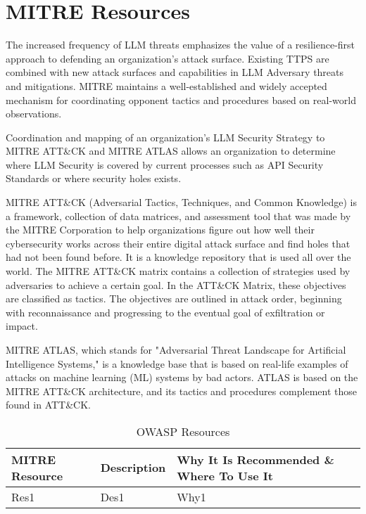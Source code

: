 \clearpage
\section{MITRE Resources}

The increased frequency of LLM threats emphasizes the value of a
resilience-first approach to defending an organization's attack surface.
Existing TTPS are combined with new attack surfaces and capabilities in LLM
Adversary threats and mitigations. MITRE maintains a well-established and
widely accepted mechanism for coordinating opponent tactics and procedures
based on real-world observations.

Coordination and mapping of an organization's LLM Security Strategy to MITRE
ATT\&CK and MITRE ATLAS allows an organization to determine where LLM Security
is covered by current processes such as API Security Standards or where
security holes exists.

MITRE ATT\&CK (Adversarial Tactics, Techniques, and Common Knowledge) is a
framework, collection of data matrices, and assessment tool that was made by
the MITRE Corporation to help organizations figure out how well their
cybersecurity works across their entire digital attack surface and find holes
that had not been found before. It is a knowledge repository that is used all
over the world. The MITRE ATT\&CK matrix contains a collection of strategies
used by adversaries to achieve a certain goal. In the ATT\&CK Matrix, these
objectives are classified as tactics. The objectives are outlined in attack
order, beginning with reconnaissance and progressing to the eventual goal of
exfiltration or impact.

MITRE ATLAS, which stands for "Adversarial Threat Landscape for Artificial
Intelligence Systems," is a knowledge base that is based on real-life examples
of attacks on machine learning (ML) systems by bad actors. ATLAS is based on the
MITRE ATT\&CK architecture, and its tactics and procedures complement those
found in ATT\&CK.

\begin{table}[h]
\begin{tabularx}{\textwidth} {
  | >{\raggedright\arraybackslash}X
  | >{\raggedright\arraybackslash}X
  | >{\raggedright\arraybackslash}X | }
 \hline
    \textbf{MITRE Resource} & \textbf{Description} & \textbf{Why It Is Recommended \& Where To Use It}   \\
    \hline
    Res1 & Des1  & Why1  \\
    \hline
\end{tabularx}
\caption{OWASP Resources}
\label{tab:team}
\end{table}

